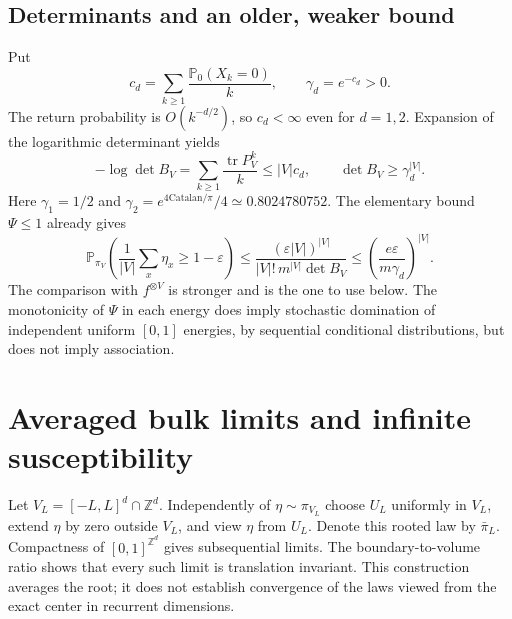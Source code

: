 \documentclass[11pt]{article}
\numberwithin{equation}{section}
\theoremstyle{definition}
\newcommand{\Prob}{\mathbb P}
\newcommand{\Z}{\mathbb Z}
\begin{document}
\subsection{Determinants and an older, weaker bound}
Put
\begin{equation}\label{eq:cd}
 c_d=\sum_{k\ge1}\frac{\Prob_0(X_k=0)}k,\qquad \gamma_d=e^{-c_d}>0.
\end{equation}
The return probability is $O(k^{-d/2})$, so $c_d<\infty$ even for $d=1,2$. Expansion of the logarithmic determinant yields
\begin{equation}\label{eq:det-bound}
 -\log\det B_V=\sum_{k\ge1}\frac{\operatorname{tr}P_V^k}k
 \le |V|c_d,\qquad \det B_V\ge\gamma_d^{|V|}.
\end{equation}
Here $\gamma_1=1/2$ and $\gamma_2=e^{4\mathrm{Catalan}/\pi}/4\simeq0.8024780752$.
The elementary bound $\Psi\le1$ already gives
\[
 \Prob_{\pi_V}\left(\frac1{|V|}\sum_x\eta_x\ge1-\varepsilon\right)
 \le\frac{(\varepsilon|V|)^{|V|}}{|V|!\,m^{|V|}\det B_V}
 \le\left(\frac{e\varepsilon}{m\gamma_d}\right)^{|V|}.
\]
The comparison with $f^{\otimes V}$ is stronger and is the one to use below. The monotonicity of $\Psi$ in each energy does imply stochastic domination of independent uniform $[0,1]$ energies, by sequential conditional distributions, but does not imply association.

\section{Averaged bulk limits and infinite susceptibility}\label{sec:limits}

Let $V_L=[-L,L]^d\cap\Z^d$. Independently of $\eta\sim\pi_{V_L}$ choose $U_L$ uniformly in $V_L$, extend $\eta$ by zero outside $V_L$, and view $\eta$ from $U_L$. Denote this rooted law by $\bar\pi_L$. Compactness of $[0,1]^{\Z^d}$ gives subsequential limits. The boundary-to-volume ratio shows that every such limit is translation invariant. This construction averages the root; it does not establish convergence of the laws viewed from the exact center in recurrent dimensions.
\end{document}

